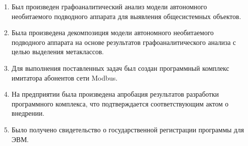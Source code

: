 \begin{enumerate}
  \item Был произведен графоаналитический анализ модели автономного необитаемого подводного аппарата для выявления
      общесистемных объектов.
  \item Была произведена декомпозиция модели автономного необитаемого подводного аппарата на основе результатов
      графоаналитического анализа с целью выделения метаклассов.
  \item Для выполнения поставленных задач был создан программный комплекс имитатора абонентов сети Modbus.
  \item На предприятии \leadingOrganizationTitle была произведена апробация результатов разработки программного комплекса,
      что подтверждается соответствующим актом о внедрении.
  \item Было получено свидетельство о государственной регистрации программы для ЭВМ.
\end{enumerate}
